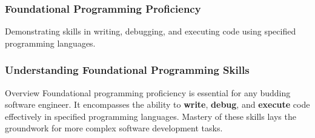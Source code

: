 \documentclass{beamer}
\begin{document}
\begin{frame}[fragile]
    \frametitle{Foundational Programming Proficiency}
    Demonstrating skills in writing, debugging, and executing code using specified programming languages.
\end{frame}

\begin{frame}[fragile]
    \frametitle{Understanding Foundational Programming Skills}
    \begin{block}{Overview}
        Foundational programming proficiency is essential for any budding software engineer. It encompasses the ability to \textbf{write}, \textbf{debug}, and \textbf{execute} code effectively in specified programming languages. Mastery of these skills lays the groundwork for more complex software development tasks.
    \end{block}
\end{frame}
\end{document}
